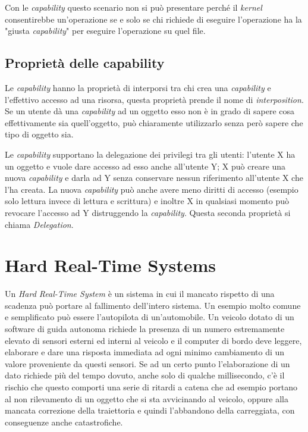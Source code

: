 Con le \textit{capability} questo scenario non si può presentare perché il \textit{kernel} consentirebbe un'operazione se e solo se chi richiede di eseguire l'operazione ha la "giusta \textit{capability}" per eseguire l'operazione su quel file. 

\subsection{Proprietà delle capability}
Le \textit{capability} hanno la proprietà di interporsi tra chi crea una \textit{capability} e l'effettivo accesso ad una risorsa, questa proprietà prende il nome di \textit{interposition}. Se un utente dà una \textit{capability} ad un oggetto esso non è in grado di sapere cosa effettivamente sia quell'oggetto, può chiaramente utilizzarlo senza però sapere che tipo di oggetto sia.

Le \textit{capability} supportano la delegazione dei privilegi tra gli utenti: l'utente X ha un oggetto e vuole dare accesso ad esso anche all'utente Y; X può creare una nuova \textit{capability} e darla ad Y senza conservare nessun riferimento all'utente X che l'ha creata. La nuova \textit{capability} può anche avere meno diritti di accesso (esempio solo lettura invece di lettura e scrittura) e inoltre X in qualsiasi momento può revocare l'accesso ad Y distruggendo la \textit{capability}. Questa seconda proprietà si chiama \textit{Delegation}.

\section{Hard Real-Time Systems}
Un \textit{Hard Real-Time System} è un sistema in cui il mancato rispetto di una scadenza può portare al fallimento dell'intero sistema. Un esempio molto comune e semplificato può essere l'autopilota di un'automobile. Un veicolo dotato di un software di guida autonoma richiede la presenza di un numero estremamente elevato di sensori esterni ed interni al veicolo e il computer di bordo deve leggere, elaborare e dare una risposta immediata ad ogni minimo cambiamento di un valore proveniente da questi sensori. Se ad un certo punto l'elaborazione di un dato richiede più del tempo dovuto, anche solo di qualche millisecondo, c'è il rischio che questo comporti una serie  di ritardi a catena che ad esempio portano al non rilevamento di un oggetto che si sta avvicinando al veicolo, oppure alla mancata correzione della traiettoria e quindi l'abbandono della carreggiata, con conseguenze anche catastrofiche.

